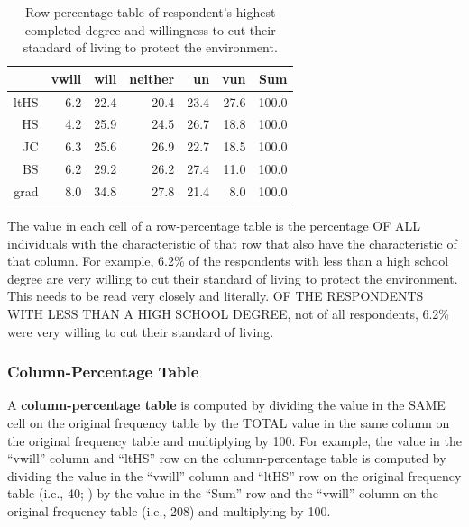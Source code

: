 \documentclass[10pt,openany]{book}\usepackage[]{graphicx}\usepackage[]{color}
\begin{document}
\begin{table}[ht]
\centering
\caption{Row-percentage table of respondent's highest completed degree and willingness to cut their standard of living to protect the environment.} 
\label{tab:EnvRowP}
\begin{tabular}{rrrrrrr}
  \hline
 & vwill & will & neither & un & vun & Sum \\ 
  \hline
ltHS & 6.2 & 22.4 & 20.4 & 23.4 & 27.6 & 100.0 \\ 
  HS & 4.2 & 25.9 & 24.5 & 26.7 & 18.8 & 100.0 \\ 
  JC & 6.3 & 25.6 & 26.9 & 22.7 & 18.5 & 100.0 \\ 
  BS & 6.2 & 29.2 & 26.2 & 27.4 & 11.0 & 100.0 \\ 
  grad & 8.0 & 34.8 & 27.8 & 21.4 & 8.0 & 100.0 \\ 
   \hline
\end{tabular}
\end{table}


The value in each cell of a row-percentage table is the percentage OF ALL individuals with the characteristic of that row that also have the characteristic of that column.  For example, 6.2\% of the respondents with less than a high school degree are very willing to cut their standard of living to protect the environment.  This needs to be read very closely and literally.  OF THE RESPONDENTS WITH LESS THAN A HIGH SCHOOL DEGREE, not of all respondents, 6.2\% were very willing to cut their standard of living.


\vspace{-12pt}

\subsubsection{Column-Percentage Table}
A \textbf{column-percentage table} is computed by dividing the value in the SAME cell on the original frequency table by the TOTAL value in the same column on the original frequency table and multiplying by 100.  For example, the value in the ``vwill'' column and ``ltHS'' row on the column-percentage table  is computed by dividing the value in the ``vwill'' column and ``ltHS'' row on the original frequency table (i.e., 40; ) by the value in the ``Sum'' row and the ``vwill'' column on the original frequency table (i.e., 208) and multiplying by 100.
\end{document}
